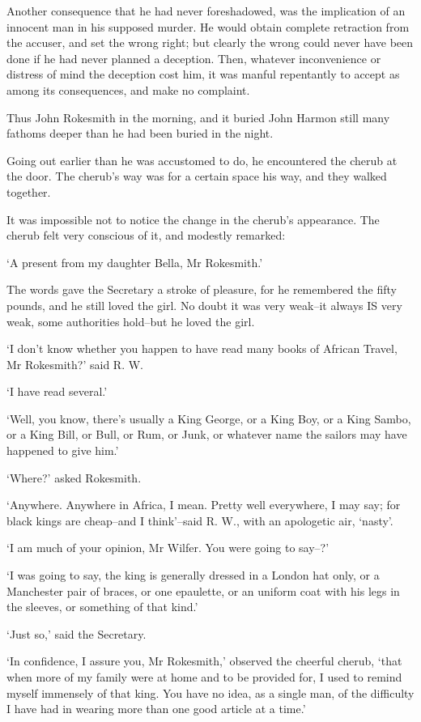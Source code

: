 Another consequence that he had never foreshadowed, was the implication
of an innocent man in his supposed murder. He would obtain complete
retraction from the accuser, and set the wrong right; but clearly the
wrong could never have been done if he had never planned a deception.
Then, whatever inconvenience or distress of mind the deception cost him,
it was manful repentantly to accept as among its consequences, and make
no complaint.

Thus John Rokesmith in the morning, and it buried John Harmon still many
fathoms deeper than he had been buried in the night.

Going out earlier than he was accustomed to do, he encountered the
cherub at the door. The cherub’s way was for a certain space his way,
and they walked together.

It was impossible not to notice the change in the cherub’s appearance.
The cherub felt very conscious of it, and modestly remarked:

‘A present from my daughter Bella, Mr Rokesmith.’

The words gave the Secretary a stroke of pleasure, for he remembered the
fifty pounds, and he still loved the girl. No doubt it was very weak--it
always IS very weak, some authorities hold--but he loved the girl.

‘I don’t know whether you happen to have read many books of African
Travel, Mr Rokesmith?’ said R. W.

‘I have read several.’

‘Well, you know, there’s usually a King George, or a King Boy, or a King
Sambo, or a King Bill, or Bull, or Rum, or Junk, or whatever name the
sailors may have happened to give him.’

‘Where?’ asked Rokesmith.

‘Anywhere. Anywhere in Africa, I mean. Pretty well everywhere, I may
say; for black kings are cheap--and I think’--said R. W., with an
apologetic air, ‘nasty’.

‘I am much of your opinion, Mr Wilfer. You were going to say--?’

‘I was going to say, the king is generally dressed in a London hat only,
or a Manchester pair of braces, or one epaulette, or an uniform coat
with his legs in the sleeves, or something of that kind.’

‘Just so,’ said the Secretary.

‘In confidence, I assure you, Mr Rokesmith,’ observed the cheerful
cherub, ‘that when more of my family were at home and to be provided
for, I used to remind myself immensely of that king. You have no idea,
as a single man, of the difficulty I have had in wearing more than one
good article at a time.’

